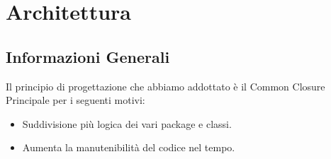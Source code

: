 \newpage
\section{Architettura}
\subsection{Informazioni Generali}
Il principio di progettazione che abbiamo addottato è il Common Closure Principale per i seguenti motivi:
\begin{itemize}
\item Suddivisione più logica dei vari package e classi.
\item Aumenta la manutenibilità del codice nel tempo.
\end{itemize}




\newpage